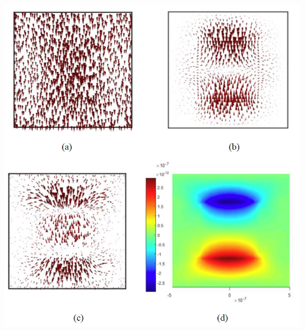 \documentclass[compress]{beamer}
\begin{document}
\begin{frame}
\begin{columns}[totalwidth=\textwidth]
\begin{column}{.62\textwidth}
	\includegraphics[width=0.99\textwidth]{Graphic/04_cubeillush1}
	\end{column}
\end{columns}
\end{frame}
\end{document}
